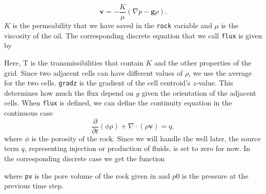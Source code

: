 \begin{equation}
    \textbf{v} = - \frac{K}{\mu}(\nabla p - \textbf{g}\rho).
    \label{eq:pressSolverDarcy}
\end{equation}
$K$ is the permeability that we have saved in the \texttt{rock} variable and $\mu$ is the viscosity of the oil.
The corresponding discrete equation that we call \texttt{flux} is given by 

Here, T is the transmissibilities that contain $K$ and the other properties of the grid. Since two adjacent cells can have different values of $\rho$, we use the  average for the two cells. \texttt{gradz} is the gradient of the cell centroid's $z$-value. This determines how much the flux depend on $g$ given the orientation of the adjacent cells. When \texttt{flux} is defined, we can define the continuity equation in the continuous case
\begin{equation}
    \frac{\partial}{\partial t}(\phi\rho) + \nabla\cdot(\rho\textbf{v}) = q,
    \label{eq:continuityEqPressure}
\end{equation}
where $\phi$ is the porosity of the rock. Since we will handle the well later, the source term $q$, representing injection or production of fluids, is set to zero for now. In the corresponding discrete case we get the function

where \texttt{pv} is the pore volume of the rock given in  and $p0$ is the pressure at the previous time step. 

